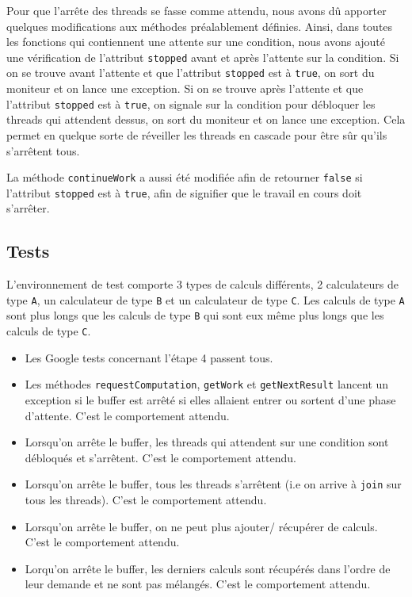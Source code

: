 \documentclass{article}
\begin{document}
Pour que l'arrête des threads se fasse comme attendu, nous avons dû apporter quelques modifications aux méthodes
préalablement définies. Ainsi, dans toutes les fonctions qui contiennent une attente sur une condition, nous avons
ajouté une vérification de l'attribut \texttt{stopped} avant et après l'attente sur la condition. Si on se trouve
avant l'attente et que l'attribut \texttt{stopped} est à \texttt{true}, on sort du moniteur et on lance
une exception. Si on se trouve après l'attente et que l'attribut \texttt{stopped} est à \texttt{true}, on signale sur
la condition pour débloquer les threads qui attendent dessus, on sort du moniteur et on lance une exception. Cela
permet en quelque sorte de réveiller les threads en cascade pour être sûr qu'ils s'arrêtent tous.

La méthode \texttt{continueWork} a aussi été modifiée afin de retourner \texttt{false} si l'attribut \texttt{stopped} est
à \texttt{true}, afin de signifier que le travail en cours doit s'arrêter.

\subsection{Tests}
L'environnement de test comporte 3 types de calculs différents, 2 calculateurs de type \texttt{A}, un
calculateur de type \texttt{B} et un calculateur de type \texttt{C}. Les calculs de type \texttt{A} sont plus longs
que les calculs de type \texttt{B} qui sont eux même plus longs que les calculs de type \texttt{C}.
\begin{itemize}
    \item Les Google tests concernant l'étape 4 passent tous.
    \item Les méthodes \texttt{requestComputation}, \texttt{getWork} et \texttt{getNextResult} lancent un exception si
    le buffer est arrêté si elles allaient entrer ou sortent d'une phase d'attente. C'est le comportement attendu.
    \item Lorsqu'on arrête le buffer, les threads qui attendent sur une condition sont débloqués et s'arrêtent. C'est
    le comportement attendu.
    \item Lorsqu'on arrête le buffer, tous les threads s'arrêtent (i.e on arrive à \texttt{join} sur tous les threads).
    C'est le comportement attendu.
    \item Lorsqu'on arrête le buffer, on ne peut plus ajouter/ récupérer de calculs. C'est le comportement attendu.
    \item Lorqu'on arrête le buffer, les derniers calculs sont récupérés dans l'ordre de leur demande et ne sont pas
    mélangés. C'est le comportement attendu.
\end{itemize}
\end{document}
